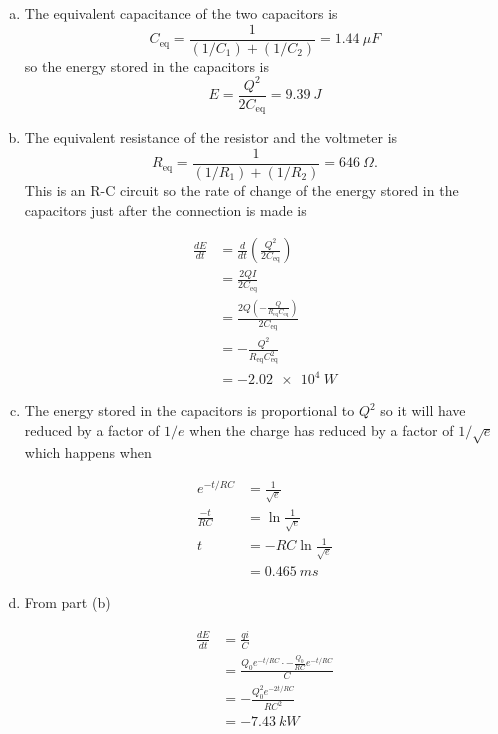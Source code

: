 \documentclass{article}
\begin{document}
\begin{enumerate}[(a)]
  \item The equivalent capacitance of the two capacitors is \[C_\textrm{eq} = \frac{1}{(1 / C_1) + (1 / C_2)} = \qty{1.44}{\mu F}\] so the energy stored in the capacitors is \[E = \frac{Q^2}{2 C_\textrm{eq}} = \qty{9.39}{J}\]

  \item The equivalent resistance of the resistor and the voltmeter is \[R_\textrm{eq} = \frac{1}{(1 / R_1) + (1 / R_2)} = \qty{646}{\Omega}.\] This is an R-C circuit so the rate of change of the energy stored in the capacitors just after the connection is made is

        \begin{align*}
          \frac{d E}{d t} & = \frac{d}{dt} \left( \frac{Q^2}{2 C_\textrm{eq}} \right)              \\
                          & = \frac{2 Q I}{2 C_\textrm{eq}}                                        \\
                          & = \frac{2 Q (-\frac{Q}{R_\textrm{eq} C_\textrm{eq}})}{2 C_\textrm{eq}} \\
                          & = -\frac{Q^2}{R_\textrm{eq} C_\textrm{eq}^2}                           \\
                          & = \qty{-2.02e4}{W}
        \end{align*}

  \item The energy stored in the capacitors is proportional to $Q^2$ so it will have reduced by a factor of $1 / e$ when the charge has reduced by a factor of $1 / \sqrt{e}$ which happens when

        \begin{align*}
          e^{-t / R C}   & = \frac{1}{\sqrt{e}}          \\
          \frac{-t}{R C} & = \ln \frac{1}{\sqrt{e}}      \\
          t              & = -R C \ln \frac{1}{\sqrt{e}} \\
                         & = \qty{0.465}{ms}
        \end{align*}

  \item From part (b)

        \begin{align*}
          \frac{d E}{d t} & = \frac{q i}{C}                                                  \\
                          & = \frac{Q_0 e^{-t / R C} \cdot -\frac{Q_0}{R C} e^{-t / R C}}{C} \\
                          & = -\frac{Q_0^2 e^{-2 t / R C}}{R C^2}                            \\
                          & = \qty{-7.43}{kW}
        \end{align*}
\end{enumerate}
\end{document}

